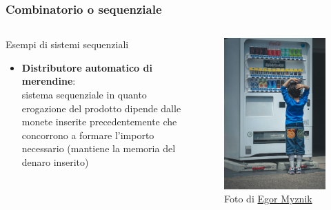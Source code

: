 \begin{frame}
	\frametitle{Combinatorio o sequenziale}
		
	\begin{columns}			
		
		\begin{block}{Esempi di sistemi sequenziali}
		\begin{itemize}
			\item \textbf{Distributore automatico di merendine}:\\sistema sequenziale in quanto erogazione del prodotto dipende dalle monete inserite precedentemente che concorrono a formare l'importo necessario (mantiene la memoria del denaro inserito)
		\end{itemize}
		\end{block}
					
		\begin{figure}[!htbp] 
			\centering
			\includegraphics[width=0.85\linewidth]{images/1_i_sistemi/vending_machine.jpg}
			\caption{Foto di \href{https://unsplash.com/it/@vonshnauzer}{Egor Myznik}}
		\end{figure}
		
	\end{columns}
	
\end{frame}


